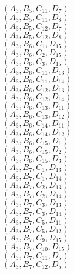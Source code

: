 \documentclass[14pt]{article}
\begin{document}
    $({A}_{3}, {B}_{5}, {C}_{11}, {D}_{7}) $ \\ 
    $({A}_{3}, {B}_{5}, {C}_{11}, {D}_{8}) $ \\ 
    $({A}_{3}, {B}_{5}, {C}_{12}, {D}_{7}) $ \\ 
    $({A}_{3}, {B}_{5}, {C}_{12}, {D}_{8}) $ \\ 
    $({A}_{3}, {B}_{6}, {C}_{1}, {D}_{15}) $ \\ 
    $({A}_{3}, {B}_{6}, {C}_{2}, {D}_{15}) $ \\ 
    $({A}_{3}, {B}_{6}, {C}_{3}, {D}_{15}) $ \\ 
    $({A}_{3}, {B}_{6}, {C}_{11}, {D}_{13}) $ \\ 
    $({A}_{3}, {B}_{6}, {C}_{11}, {D}_{14}) $ \\ 
    $({A}_{3}, {B}_{6}, {C}_{12}, {D}_{13}) $ \\ 
    $({A}_{3}, {B}_{6}, {C}_{12}, {D}_{14}) $ \\ 
    $({A}_{3}, {B}_{6}, {C}_{13}, {D}_{11}) $ \\ 
    $({A}_{3}, {B}_{6}, {C}_{13}, {D}_{12}) $ \\ 
    $({A}_{3}, {B}_{6}, {C}_{14}, {D}_{11}) $ \\ 
    $({A}_{3}, {B}_{6}, {C}_{14}, {D}_{12}) $ \\ 
    $({A}_{3}, {B}_{6}, {C}_{15}, {D}_{1}) $ \\ 
    $({A}_{3}, {B}_{6}, {C}_{15}, {D}_{2}) $ \\ 
    $({A}_{3}, {B}_{6}, {C}_{15}, {D}_{3}) $ \\ 
    $({A}_{3}, {B}_{7}, {C}_{1}, {D}_{13}) $ \\ 
    $({A}_{3}, {B}_{7}, {C}_{1}, {D}_{14}) $ \\ 
    $({A}_{3}, {B}_{7}, {C}_{2}, {D}_{13}) $ \\ 
    $({A}_{3}, {B}_{7}, {C}_{2}, {D}_{14}) $ \\ 
    $({A}_{3}, {B}_{7}, {C}_{3}, {D}_{13}) $ \\ 
    $({A}_{3}, {B}_{7}, {C}_{3}, {D}_{14}) $ \\ 
    $({A}_{3}, {B}_{7}, {C}_{5}, {D}_{11}) $ \\ 
    $({A}_{3}, {B}_{7}, {C}_{5}, {D}_{12}) $ \\ 
    $({A}_{3}, {B}_{7}, {C}_{9}, {D}_{15}) $ \\ 
    $({A}_{3}, {B}_{7}, {C}_{10}, {D}_{15}) $ \\ 
    $({A}_{3}, {B}_{7}, {C}_{11}, {D}_{5}) $ \\ 
    $({A}_{3}, {B}_{7}, {C}_{12}, {D}_{5}) $ \\ 
\end{document}
